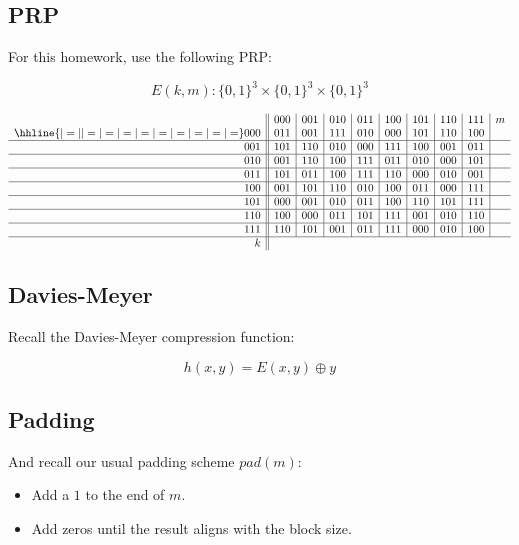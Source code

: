 \documentclass[12pt]{article}
\begin{document}
\section{}


\subsection{PRP}

\label{prp}
For this homework, use the following PRP:

$$E(k, m) : \{0, 1\}^3 \times \{0, 1\}^3 \times \{0, 1\}^3$$

$$
\begin{array}{r||c|c|c|c|c|c|c|c|c}
& 000 & 001 & 010 & 011 & 100 & 101 & 110 & 111 & m\\ \hhline{|=||=|=|=|=|=|=|=|=|=}
000 & 011 & 001 & 111 & 010 & 000 & 101 & 110 & 100 \\ \hline
001 & 101 & 110 & 010 & 000 & 111 & 100 & 001 & 011 \\ \hline
010 & 001 & 110 & 100 & 111 & 011 & 010 & 000 & 101 \\ \hline
011 & 101 & 011 & 100 & 111 & 110 & 000 & 010 & 001 \\ \hline
100 & 001 & 101 & 110 & 010 & 100 & 011 & 000 & 111 \\ \hline
101 & 000 & 001 & 010 & 011 & 100 & 110 & 101 & 111 \\ \hline
110 & 100 & 000 & 011 & 101 & 111 & 001 & 010 & 110 \\ \hline
111 & 110 & 101 & 001 & 011 & 111 & 000 & 010 & 100 \\ \hline
k
\end{array}
$$

\subsection{Davies-Meyer}
Recall the Davies-Meyer compression function:

$$
h(x, y) = E(x, y) \oplus y
$$

\subsection{Padding}
And recall our usual padding scheme $pad(m)$:

\begin{itemize}
\item Add a $1$ to the end of $m$.
\item Add zeros until the result aligns with the block size.
\end{itemize}
\end{document}
